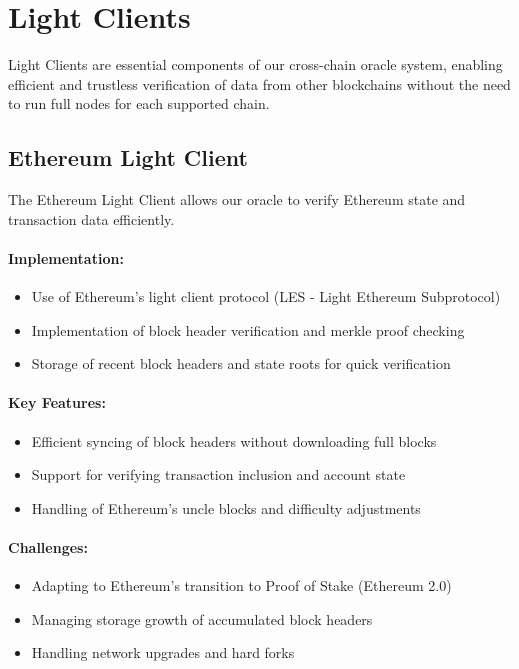 \documentclass[12pt,a4paper]{article}
\begin{document}
	\section{Light Clients}
	Light Clients are essential components of our cross-chain oracle system, enabling efficient and trustless verification of data from other blockchains without the need to run full nodes for each supported chain.
	
	\subsection{Ethereum Light Client}
	The Ethereum Light Client allows our oracle to verify Ethereum state and transaction data efficiently.
	
	\paragraph{Implementation:}
	\begin{itemize}
		\item Use of Ethereum's light client protocol (LES - Light Ethereum Subprotocol)
		\item Implementation of block header verification and merkle proof checking
		\item Storage of recent block headers and state roots for quick verification
	\end{itemize}
	
	\paragraph{Key Features:}
	\begin{itemize}
		\item Efficient syncing of block headers without downloading full blocks
		\item Support for verifying transaction inclusion and account state
		\item Handling of Ethereum's uncle blocks and difficulty adjustments
	\end{itemize}
	
	\paragraph{Challenges:}
	\begin{itemize}
		\item Adapting to Ethereum's transition to Proof of Stake (Ethereum 2.0)
		\item Managing storage growth of accumulated block headers
		\item Handling network upgrades and hard forks
	\end{itemize}
	
\end{document}
